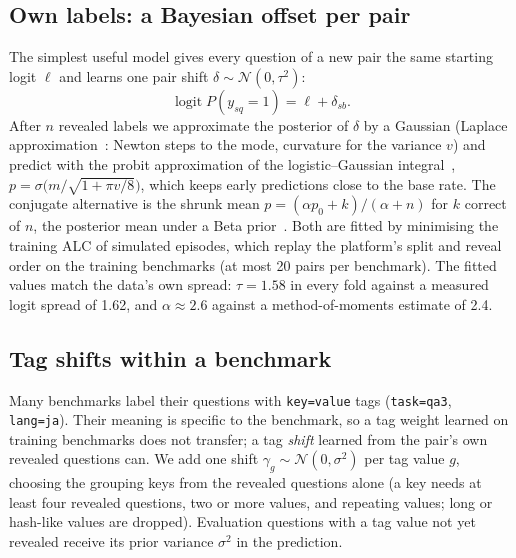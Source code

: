 \documentclass{article}
\newcommand{\code}[1]{\texttt{#1}}
\newcommand{\N}{\mathcal{N}}
\begin{document}
\subsection{Own labels: a Bayesian offset per pair}
\label{sec:offset}
The simplest useful model gives every question of a new pair the same starting logit $\ell$ and learns one pair shift $\delta \sim \N(0,\tau^2)$:
\begin{equation}
  \operatorname{logit} P(y_{sq}=1) = \ell + \delta_{sb}.
\end{equation}
After $n$ revealed labels we approximate the posterior of $\delta$ by a Gaussian (Laplace approximation~\citep{tierney1986}: Newton steps to the mode, curvature for the variance $v$) and predict with the probit approximation of the logistic--Gaussian integral~\citep{mackay1992}, $p = \sigma\big(m/\sqrt{1+\pi v/8}\big)$, which keeps early predictions close to the base rate. The conjugate alternative is the shrunk mean $p=(\alpha p_0 + k)/(\alpha+n)$ for $k$ correct of $n$, the posterior mean under a Beta prior~\citep{efron1975}. Both are fitted by minimising the training ALC of simulated episodes, which replay the platform's split and reveal order on the training benchmarks (at most 20 pairs per benchmark). The fitted values match the data's own spread: $\tau = 1.58$ in every fold against a measured logit spread of 1.62, and $\alpha \approx 2.6$ against a method-of-moments estimate of 2.4.

\subsection{Tag shifts within a benchmark}
\label{sec:tags}
Many benchmarks label their questions with \code{key=value} tags (\code{task=qa3}, \code{lang=ja}). Their meaning is specific to the benchmark, so a tag weight learned on training benchmarks does not transfer; a tag \emph{shift} learned from the pair's own revealed questions can. We add one shift $\gamma_g \sim \N(0,\sigma^2)$ per tag value $g$, choosing the grouping keys from the revealed questions alone (a key needs at least four revealed questions, two or more values, and repeating values; long or hash-like values are dropped). Evaluation questions with a tag value not yet revealed receive its prior variance $\sigma^2$ in the prediction.
\end{document}
